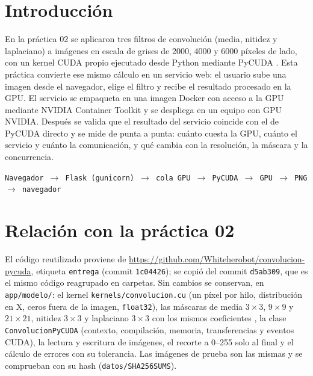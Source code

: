\documentclass[12pt]{article}
\newcommand{\repoAnterior}{\url{https://github.com/Whiteherobot/convolucion-pycuda}}
\begin{document}
\tableofcontents
\vspace{1em}

\section{Introducción}

En la práctica 02 se aplicaron tres filtros de convolución (media, nitidez y laplaciano) a imágenes en
escala de grises de 2000, 4000 y 6000 píxeles de lado, con un kernel CUDA propio ejecutado desde
Python mediante PyCUDA \cite{klockner2012,pycudadoc}. Esta práctica convierte ese mismo cálculo en un
servicio web: el usuario sube una imagen desde el navegador, elige el filtro y recibe el resultado
procesado en la GPU. El servicio se empaqueta en una imagen Docker con acceso a la GPU mediante NVIDIA
Container Toolkit \cite{nvidiactk} y se despliega en un equipo con GPU NVIDIA. Después se valida que
el resultado del servicio coincide con el de PyCUDA directo y se mide de punta a punta: cuánto cuesta
la GPU, cuánto el servicio y cuánto la comunicación, y qué cambia con la resolución, la máscara y la
concurrencia.

\begin{center}
\texttt{Navegador $\to$ Flask (gunicorn) $\to$ cola GPU $\to$ PyCUDA $\to$ GPU $\to$ PNG $\to$ navegador}
\end{center}

\section{Relación con la práctica 02}

El código reutilizado proviene de \repoAnterior, etiqueta \texttt{entrega} (commit \texttt{1c04426});
se copió del commit \texttt{d5ab309}, que es el mismo código reagrupado en carpetas. Sin cambios se
conservan, en \texttt{app/modelo/}: el kernel \texttt{kernels/convolucion.cu} (un píxel por hilo,
distribución en X, ceros fuera de la imagen, \texttt{float32}), las máscaras de media
$3\times3$, $9\times9$ y $21\times21$, nitidez $3\times3$ y laplaciano $3\times3$ con los mismos
coeficientes \cite{gonzalez2018}, la clase \texttt{ConvolucionPyCUDA} (contexto, compilación,
memoria, transferencias y eventos CUDA), la lectura y escritura de imágenes, el recorte a 0--255 solo
al final y el cálculo de errores con su tolerancia. Las imágenes de prueba son las mismas y se
comprueban con su hash (\texttt{datos/SHA256SUMS}).
\end{document}
